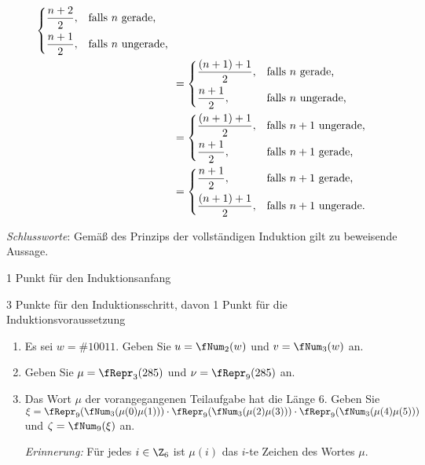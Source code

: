 \documentclass[12pt]{article}
\begin{document}
\begin{loesung}
\begin{enumerate}
\begin{align*}
\begin{dcases*}
                           \frac{n + 2}{2}, &falls $n$ gerade,\\
                           \frac{n + 1}{2}, &falls $n$ ungerade,
                         \end{dcases*}\\
                      &= \begin{dcases*}
                           \frac{(n + 1) + 1}{2}, &falls $n$ gerade,\\
                           \frac{n + 1}{2},       &falls $n$ ungerade,
                         \end{dcases*}\\
                      &= \begin{dcases*}
                           \frac{(n + 1) + 1}{2}, &falls $n + 1$ ungerade,\\
                           \frac{n + 1}{2},       &falls $n + 1$ gerade,
                         \end{dcases*}\\
                      &= \begin{dcases*}
                           \frac{n + 1}{2},       &falls $n + 1$ gerade,\\
                           \frac{(n + 1) + 1}{2}, &falls $n + 1$ ungerade.
                         \end{dcases*}\\
          \end{align*}

          \emph{Schlussworte}: Gemäß des Prinzips der vollständigen Induktion
          gilt zu beweisende Aussage.
          \begin{korrektur}
            1 Punkt für den Induktionsanfang

            3 Punkte für den Induktionsschritt, davon 1 Punkt für die Induktionsvoraussetzung
          \end{korrektur}
  \end{enumerate}
\end{loesung}


\begin{aufgabe}[1 + 1 + 1 = 3]
  \begin{enumerate}
    \item Es sei $w = \#{10011}$. Geben Sie $u = \fNum_2(w)$ und $v = \fNum_3(w)$ an.
    \item Geben Sie $\mu = \fRepr_3(285)$ und $\nu = \fRepr_9(285)$ an.
    \item Das Wort $\mu$ der vorangegangenen Teilaufgabe hat die Länge $6$. Geben Sie $\xi = \fRepr_9(\fNum_3(\mu(0)\mu(1))) \cdot \fRepr_9(\fNum_3(\mu(2)\mu(3))) \cdot \fRepr_9(\fNum_3(\mu(4)\mu(5)))$ und $\zeta = \fNum_9(\xi)$ an.

          \emph{Erinnerung:} Für jedes $i \in \Z_6$ ist $\mu(i)$ das $i$-te Zeichen des Wortes $\mu$.
  \end{enumerate}
\end{aufgabe}
\end{document}
